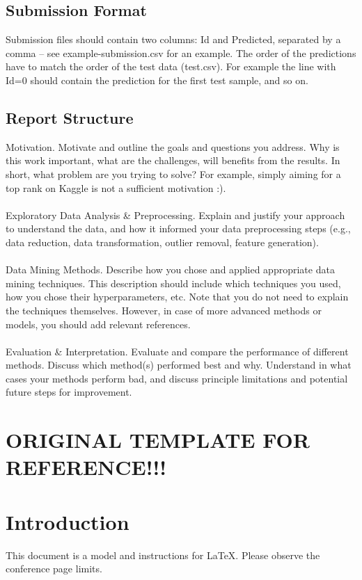 \documentclass[conference]{IEEEtran}
\begin{document}
\subsection{Submission Format}
Submission files should contain two columns: Id and Predicted, separated by a comma -- see example-submission.csv for an example. The order of the predictions have to match the order of the test data (test.csv). For example the line with Id=0 should contain the prediction for the first test sample, and so on.
\subsection{Report Structure}
Motivation. Motivate and outline the goals and questions you address. Why is this work important, what are the challenges, will benefits from the results. In short, what problem are you trying to solve? For example, simply aiming for a top rank on Kaggle is not a sufficient motivation :).
\\\\
Exploratory Data Analysis \& Preprocessing. Explain and justify your approach to understand the data, and how it informed your data preprocessing steps (e.g., data reduction, data transformation, outlier removal, feature generation).
\\\\
Data Mining Methods. Describe how you chose and applied appropriate data mining techniques. This description should include which techniques you used, how you chose their hyperparameters, etc. Note that you do not need to explain the techniques themselves. However, in case of more advanced methods or models, you should add relevant references.
\\\\
Evaluation \& Interpretation. Evaluate and compare the performance of different methods. Discuss which method(s) performed best and why. Understand in what cases your methods perform bad, and discuss principle limitations and potential future steps for improvement.


\newpage
\section{ORIGINAL TEMPLATE FOR REFERENCE!!!}
\section{Introduction}
This document is a model and instructions for \LaTeX.
Please observe the conference page limits. 
\end{document}
